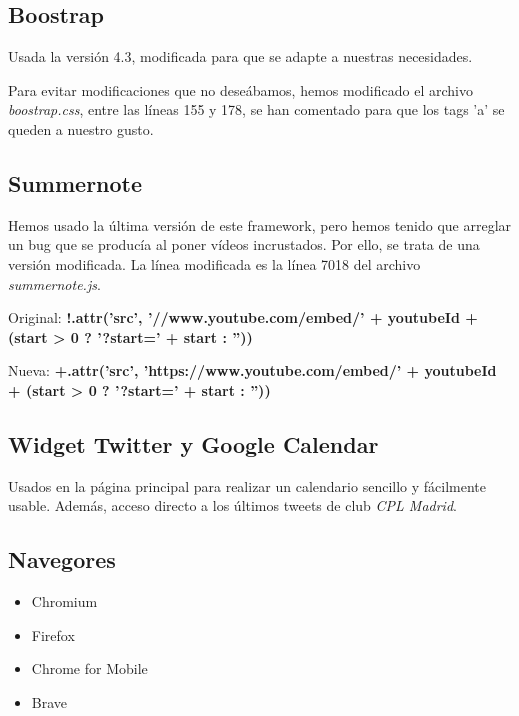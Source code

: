 \documentclass[10pt, spanish, pdftex]{template/UC3M_document}
\begin{document}
\subsection{Boostrap}
Usada la versión 4.3, modificada para que se adapte a nuestras necesidades.

Para evitar modificaciones que no deseábamos, hemos modificado el archivo \textit{boostrap.css}, entre las líneas 155 y 178, se han comentado para que los tags 'a' se queden a nuestro gusto.
\subsection{Summernote}
Hemos usado la última versión de este framework, pero hemos tenido que arreglar un bug que se producía al poner vídeos incrustados. Por ello, se trata de una versión modificada. La línea modificada es la línea 7018 del archivo \textit{summernote.js}.

Original: \textbf{!.attr('src', '//www.youtube.com/embed/' + youtubeId + (start > 0 ? '?start=' + start : ''))}

Nueva: \textbf{+.attr('src', 'https://www.youtube.com/embed/' + youtubeId + (start > 0 ? '?start=' + start : ''))}

\subsection{Widget Twitter y Google Calendar}
Usados en la página principal para realizar un calendario sencillo y fácilmente usable. Además, acceso directo a los últimos tweets de club \textit{CPL Madrid}.
\subsection{Navegores}
\begin{itemize}
  \item Chromium
  \item Firefox
  \item Chrome for Mobile
  \item Brave
\end{itemize}

\newpage
\end{document}
